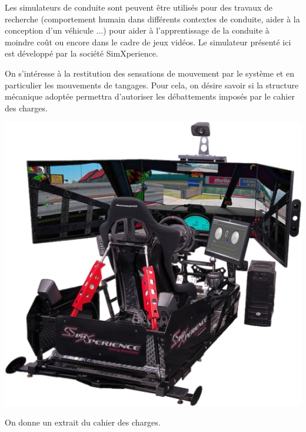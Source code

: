 \documentclass[10pt]{article}
\newif\ifprof
\begin{document}
\begin{minipage}[c]{.7\linewidth}
Les simulateurs de conduite sont peuvent être utilisés pour des travaux de recherche (comportement humain dans différents contextes de conduite, aider à la conception d'un véhicule ...) pour aider à l'apprentissage de la conduite à moindre coût ou encore dans le cadre de jeux vidéos. Le simulateur présenté ici est développé par la société SimXperience. 
\begin{obj} 

On s'intéresse à la restitution des sensations de mouvement par le système et en particulier les mouvements de tangages. Pour cela, on désire savoir si la structure mécanique adoptée permettra d'autoriser les débattements imposés par le cahier des charges. 
\end{obj}


 
\end{minipage} \hfill
\begin{minipage}[c]{.25\linewidth}
\begin{center}
\includegraphics[width=\textwidth]{images/Simulateur1}
\end{center}
\end{minipage}

\ifprof
\else
 On donne un extrait du cahier des charges.
\end{document}
